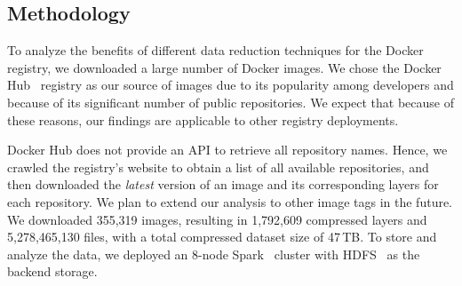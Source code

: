 \subsection{Methodology}
\label{sec:methodology}

%

To analyze the benefits of different data reduction techniques for the Docker registry,
we downloaded a large number of Docker images.
%
We chose the Docker Hub~\cite{docker-hub} registry as our source of images
due to its popularity among developers and because of its significant number
of public repositories.
%
We expect that because of these reasons, our findings are applicable to other
registry deployments.

Docker Hub does not provide an API to retrieve all repository names.
Hence, we crawled the registry's website to obtain a list of all available
repositories, and then downloaded the \emph{latest} version of an image and its
corresponding layers for each repository.
%
We plan to extend our analysis to other image tags in the future.
%
We downloaded 355,319 images, resulting in 1,792,609 compressed layers
and 5,278,465,130 files, with a total compressed dataset size of 47\,TB.
%
%
To store and analyze the data, we deployed an 8-node Spark~\cite{spark}
cluster with HDFS~\cite{hdfs} as the backend storage.

